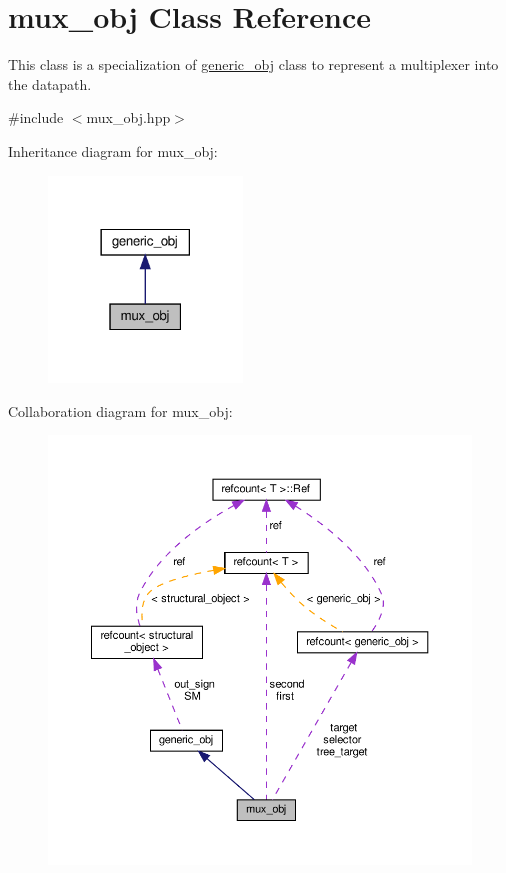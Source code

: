 \hypertarget{classmux__obj}{}\section{mux\+\_\+obj Class Reference}
\label{classmux__obj}


This class is a specialization of \hyperlink{classgeneric__obj}{generic\+\_\+obj} class to represent a multiplexer into the datapath.  




{\ttfamily \#include $<$mux\+\_\+obj.\+hpp$>$}



Inheritance diagram for mux\+\_\+obj\+:
\nopagebreak
\begin{figure}[H]
\begin{center}
\leavevmode
\includegraphics[width=146pt]{df/d83/classmux__obj__inherit__graph}
\end{center}
\end{figure}


Collaboration diagram for mux\+\_\+obj\+:
\nopagebreak
\begin{figure}[H]
\begin{center}
\leavevmode
\includegraphics[width=350pt]{da/d5a/classmux__obj__coll__graph}
\end{center}
\end{figure}
